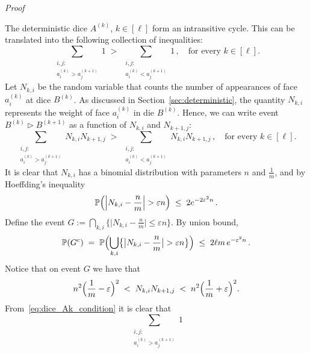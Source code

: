 \documentclass[reqno,a4paper,11pt]{amsart}
\makeatletter
\newcommand{\btt}{\triangleright}
\theoremstyle{remark}
\newcommand{\bb}[1]{{\mathbb #1}}
\numberwithin{equation}{section}
\renewenvironment{proof}[1][Proof]{\par
\pushQED{\qed}%
\normalfont \topsep6\p@\@plus6\p@\relax
\trivlist
\item\relax
{\itshape
#1\@addpunct{.}}\hspace\labelsep\ignorespaces
}{%
\popQED\endtrivlist\@endpefalse
}
\makeatother
\begin{document}
\begin{proof}
	The deterministic dice $A^{(k)}$, $k \in [\ell]$ form an intransitive cycle. This
	can be translated into the following collection of inequalities:
	\begin{equation}
	\label{eq:dice_Ak_condition}
	\sum_{\substack{i,j:\\ a^{(k)}_i > a^{(k+1)}_j}} 1
	\;>\; \sum_{\substack{i,j:\\ a^{(k)}_i < a^{(k+1)}_j}} 1\,,
	\quad \text{for every $k \in [\ell]$}.
	\end{equation}
	Let $N_{k,i}$ be the random variable that counts the number of appearances of
	face $a^{(k)}_i$ at dice $B^{(k)}$. As discussed in Section~\ref{sec:deterministic},
	the quantity $N_{k,i}$ represents the weight of face $a^{(k)}_i$ in die
	$B^{(k)}$. Hence, we can write event $B^{(k)} \btt B^{(k+1)}$ as a function
	of $N_{k,i}$ and $N_{k+1,j}$:
	\begin{equation}
	\sum_{\substack{i,j:\\ a^{(k)}_i > a^{(k+1)}_j}} N_{k,i} N_{k+1,j}
	\;>\; \sum_{\substack{i,j:\\ a^{(k)}_i < a^{(k+1)}_j}} N_{k,i} N_{k+1,j}\,,
	\quad \text{for every $k \in [\ell]$}.
	\end{equation}
	It is clear that $N_{k,i}$ has a binomial distribution with parameters $n$ and
	$\frac{1}{m}$, and by Hoeffding's inequality
	\begin{equation}
	\label{eq:concentration_N_k_i}
	\bb P \Bigl( \Bigl|N_{k,i} - \frac{n}{m}\Bigr| > \varepsilon n\Bigr)
	\;\le\; 2 e^{- 2 \varepsilon^2 n}\,.
	\end{equation}
	Define the event $G := \bigcap_{k,i} \bigl\{
	\bigl|N_{k,i} - \frac{n}{m}\bigr| \le \varepsilon n \bigr\}$. By union bound,
	\begin{equation*}
	\bb P(G^c)
	\;=\; \bb P \Bigl( \bigcup_{k,i} \bigl\{
	\bigl|N_{k,i} - \frac{n}{m}\bigr| > \varepsilon n \bigr\}\Bigr)
	\;\le\; 2\ell m\, e^{- \varepsilon^2 n}\,.
	\end{equation*}
	Notice that on event $G$ we have that
	\begin{equation}
	\label{eq:estimates_prod_Ni_Nj}
	n^2 \Bigl(\frac{1}{m} - \varepsilon \Bigr)^2
	\;<\; N_{k,i} N_{k+1,j}
	\;<\; n^2 \Bigl(\frac{1}{m} + \varepsilon \Bigr)^2.
	\end{equation}
	From~\eqref{eq:dice_Ak_condition} it is clear that
	\begin{equation*}
	\sum_{\substack{i,j:\\ a^{(k)}_i > a^{(k+1)}_j}} 1

\end{equation*}
\end{proof}
\end{document}
